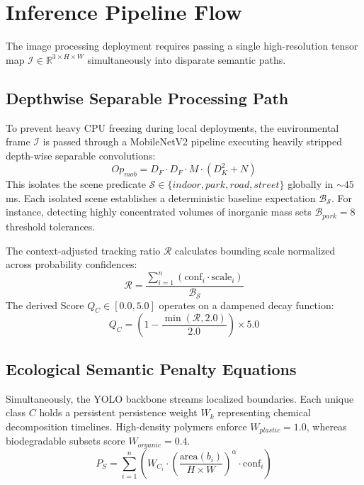 \documentclass[10pt,twocolumn,letterpaper]{article}
\begin{document}
\section{Inference Pipeline Flow}

The image processing deployment requires passing a single high-resolution tensor map $\mathcal{I} \in \mathbb{R}^{3 \times H \times W}$ simultaneously into disparate semantic paths. 

\subsection{Depthwise Separable Processing Path}
To prevent heavy CPU freezing during local deployments, the environmental frame $\mathcal{I}$ is passed through a MobileNetV2 pipeline executing heavily stripped depth-wise separable convolutions:
\begin{equation}
Op_{mob} = D_F \cdot D_F \cdot M \cdot (D_K^2 + N)
\end{equation}
This isolates the scene predicate $\mathcal{S} \in \{indoor, park, road, street\}$ globally in $\sim45$ms. Each isolated scene establishes a deterministic baseline expectation $\mathcal{B}_{\mathcal{S}}$. For instance, detecting highly concentrated volumes of inorganic mass sets $\mathcal{B}_{park} = 8$ threshold tolerances.

The context-adjusted tracking ratio $\mathcal{R}$ calculates bounding scale normalized across probability confidences:
\begin{equation}
\mathcal{R} = \frac{\sum_{i=1}^{n} (\text{conf}_i \cdot \text{scale}_{i})}{\mathcal{B}_{\mathcal{S}}}
\end{equation}
The derived Score $Q_C \in [0.0, 5.0]$ operates on a dampened decay function:
\begin{equation}
Q_C = \left( 1 - \frac{\min(\mathcal{R}, 2.0)}{2.0} \right) \times 5.0
\end{equation}

\subsection{Ecological Semantic Penalty Equations}
Simultaneously, the YOLO backbone streams localized boundaries. Each unique class $C$ holds a persistent persistence weight $W_k$ representing chemical decomposition timelines. High-density polymers enforce $W_{plastic} = 1.0$, whereas biodegradable subsets score $W_{organic} = 0.4$.
\begin{equation}
P_S = \sum_{i=1}^{n} \left( W_{C_i} \cdot \left(\frac{\text{area}(b_i)}{H \times W}\right)^{\!\alpha} \cdot \text{conf}_i \right)
\end{equation}
\end{document}
